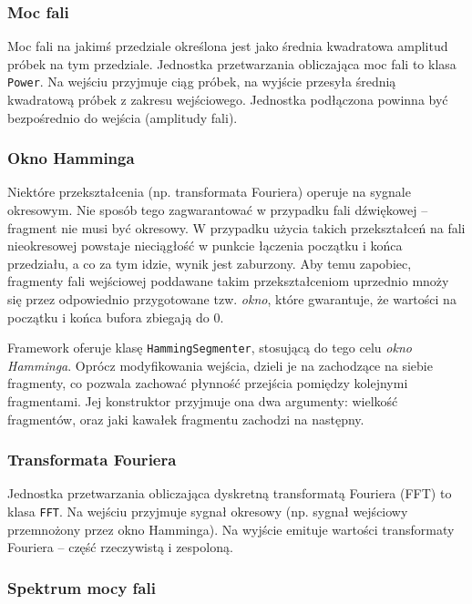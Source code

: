 \subsubsection{Moc fali}

Moc fali na jakimś przedziale określona jest jako średnia kwadratowa amplitud próbek na tym
przedziale. Jednostka przetwarzania obliczająca moc fali to klasa \texttt{Power}. Na wejściu
przyjmuje ciąg próbek, na wyjście przesyła średnią kwadratową próbek z zakresu wejściowego.
Jednostka podłączona powinna być bezpośrednio do wejścia (amplitudy fali).

\subsubsection{Okno Hamminga}

Niektóre przekształcenia (np. transformata Fouriera) operuje na sygnale okresowym. Nie sposób tego
zagwarantować w przypadku fali dźwiękowej -- fragment nie musi być okresowy. W przypadku użycia
takich przekształceń na fali nieokresowej powstaje nieciągłość w punkcie łączenia początku i końca
przedziału, a co za tym idzie, wynik jest zaburzony. Aby temu zapobiec, fragmenty fali wejściowej
poddawane takim przekształceniom uprzednio mnoży się przez odpowiednio przygotowane tzw.
\emph{okno}, które gwarantuje, że wartości na początku i końca bufora zbiegają do 0.

Framework oferuje klasę \texttt{HammingSegmenter}, stosującą do tego celu \emph{okno Hamminga}.
Oprócz modyfikowania wejścia, dzieli je na zachodzące na siebie fragmenty, co pozwala zachować
płynność przejścia pomiędzy kolejnymi fragmentami. Jej konstruktor przyjmuje ona dwa argumenty:
wielkość fragmentów, oraz jaki kawałek fragmentu zachodzi na następny.

\subsubsection{Transformata Fouriera}

Jednostka przetwarzania obliczająca dyskretną transformatą Fouriera (FFT) to klasa \texttt{FFT}. Na
wejściu przyjmuje sygnał okresowy (np. sygnał wejściowy przemnożony przez okno Hamminga). Na wyjście
emituje wartości transformaty Fouriera -- część rzeczywistą i zespoloną.

\subsubsection{Spektrum mocy fali}

